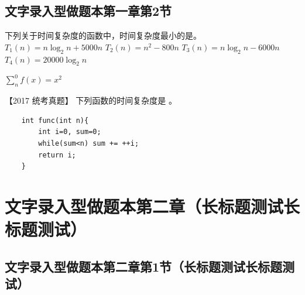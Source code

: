 \documentclass[standard, analysis]{ExBook}
\begin{document}
\subsection{文字录入型做题本第一章第2节}
 
\begin{qitems}

    \begin{bbox}
        \qitem   下列关于时间复杂度的函数中，时间复杂度最小的是\blankbox 。
        \fourchoices
        {$T_1(n)=n\log_2n +5000n$}
        {$T_2(n)=n^2 - 800n$}
        {$T_3(n)=n\log_2n - 6000n$}
        {$T_4(n)=20000\log_2n$}
        \begin{analysis}
            $\displaystyle\sum \limits_{n}^{0}f(x)=x^2$
        \end{analysis}
    \end{bbox}

    \begin{bbox}
        \qitem   【2017 统考真题】 下列函数的时间复杂度是 \blankbox 。
        \begin{lstlisting}
    int func(int n){
        int i=0, sum=0;
        while(sum<n) sum += ++i;
        return i; 
    }
        \end{lstlisting}
    \end{bbox}

\end{qitems}

\section{文字录入型做题本第二章（长标题测试长标题测试）}
\subsection{文字录入型做题本第二章第1节（长标题测试长标题测试）}
\end{document}
